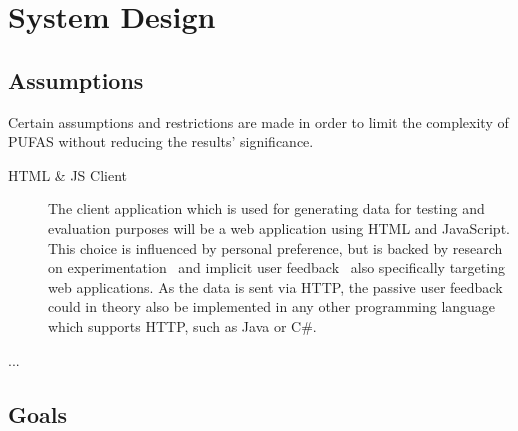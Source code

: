 %
\chapter{System Design}
\label{ch:design}

\section{Assumptions}
\label{sec:design:assumptions}

Certain assumptions and restrictions are made in order to limit the complexity of \ac{PUFAS} without reducing the results' significance.

\begin{description}
\item[HTML \& JS Client] The client application which is used for generating data for testing and evaluation purposes will be a web application using \ac{HTML} and JavaScript.
This choice is influenced by personal preference, but is backed by research on experimentation~\cite{Dmitriev2017,Kohavi2013a} and implicit user feedback~\cite{Joachims2005,Huang2011} also specifically targeting web applications.
As the data is sent via \ac{HTTP}, the passive user feedback could in theory also be implemented in any other programming language which supports \ac{HTTP}, such as Java or C\#.
\item [...]
\end{description}

\section{Goals}
\label{sec:design:goals}

